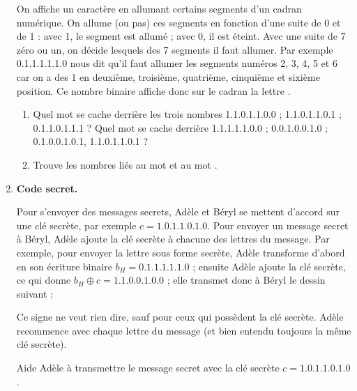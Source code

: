 \documentclass[class=report,crop=false, 12pt]{standalone}
\begin{document}
\begin{activite}
\begin{enumerate}
On affiche un caractère en allumant certains segments d'un cadran numérique. On allume (ou pas) ces segments en fonction d'une suite de 0 et de 1 : avec 1, le segment est allumé ; avec 0, il est éteint. Avec une suite de 7 zéro ou un, on décide lesquels des 7 segments il faut allumer. Par exemple 0.1.1.1.1.1.0 nous dit qu'il faut allumer les segments numéros 2, 3, 4, 5 et 6 car on a des 1 en deuxième, troisième, quatrième, cinquième et sixième position. Ce nombre binaire affiche donc sur le cadran la lettre .





  \begin{enumerate}
    \item Quel mot se cache derrière les trois nombres 1.1.0.1.1.0.0 ; 1.1.0.1.1.0.1 ; 0.1.1.0.1.1.1 ? Quel mot se cache derrière 1.1.1.1.1.0.0 ; 0.0.1.0.0.1.0 ; 0.1.0.0.1.0.1, 1.1.0.1.1.0.1 ?

     
    \item Trouve les nombres liés au mot  et au mot . 


   
    
  \end{enumerate}  
  
  \item \textbf{Code secret.}
   
Pour s'envoyer des messages secrets, Adèle et Béryl se mettent d'accord sur une clé secrète, par exemple $c = 1.0.1.1.0.1.0$. Pour envoyer un message secret à Béryl, Adèle ajoute la clé secrète à chacune des lettres du message. Par exemple, pour envoyer la lettre  sous forme secrète, Adèle transforme d'abord  en son écriture binaire $b_H = 0.1.1.1.1.1.0$ ; ensuite Adèle ajoute la clé secrète, ce qui donne $b_H \oplus c = 1.1.0.0.1.0.0$ ; elle transmet donc à Béryl le dessin suivant : 

   
Ce signe ne veut rien dire, sauf pour ceux qui possèdent la clé secrète. Adèle recommence avec chaque lettre du message (et bien entendu toujours la même clé secrète).

    Aide Adèle à transmettre le message secret  avec la clé secrète $c = 1.0.1.1.0.1.0$.



\end{enumerate}
\end{activite}
\end{document}
